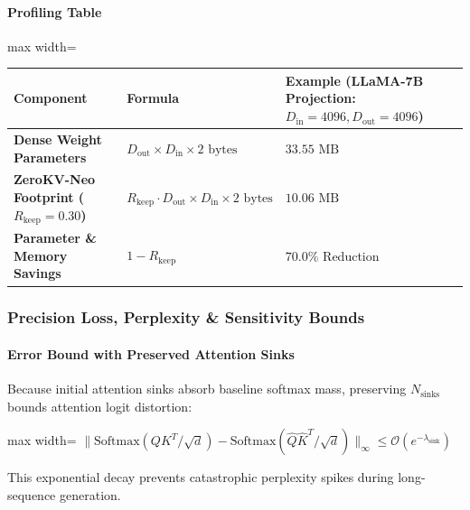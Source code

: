 \paragraph{Profiling Table}

\begin{center}
\begin{adjustbox}{max width=\columnwidth}
\renewcommand{\arraystretch}{1.2}
\begin{tabular}{lll}
\toprule
Component & Formula & Example (LLaMA-7B Projection: $D_{\text{in}}=4096, D_{\text{out}}=4096$) \\
\midrule
\textbf{Dense Weight Parameters} & $D_{\text{out}} \times D_{\text{in}} \times 2 \text{ bytes}$ & $33.55 \text{ MB}$ \\
\textbf{ZeroKV-Neo Footprint ($R_{\text{keep}}=0.30$)} & $R_{\text{keep}} \cdot D_{\text{out}} \times D_{\text{in}} \times 2 \text{ bytes}$ & $10.06 \text{ MB}$ \\
\textbf{Parameter \& Memory Savings} & $1 - R_{\text{keep}}$ & $\mathbf{70.0\%}$ Reduction \\

\bottomrule
\end{tabular}
\end{adjustbox}
\end{center}

\subsubsection*{Precision Loss, Perplexity \& Sensitivity Bounds}

\paragraph{Error Bound with Preserved Attention Sinks}

Because initial attention sinks absorb baseline softmax mass, preserving $N_{\text{sinks}}$ bounds attention logit distortion:

\begin{center}
\begin{adjustbox}{max width=\columnwidth}
$\displaystyle
\| \text{Softmax}(Q K^T / \sqrt{d}) - \text{Softmax}(\widehat{Q} \widehat{K}^T / \sqrt{d}) \|_\infty \le \mathcal{O}\left( e^{-\lambda_{\text{sink}}} \right)
$
\end{adjustbox}
\end{center}

This exponential decay prevents catastrophic perplexity spikes during long-sequence generation.


